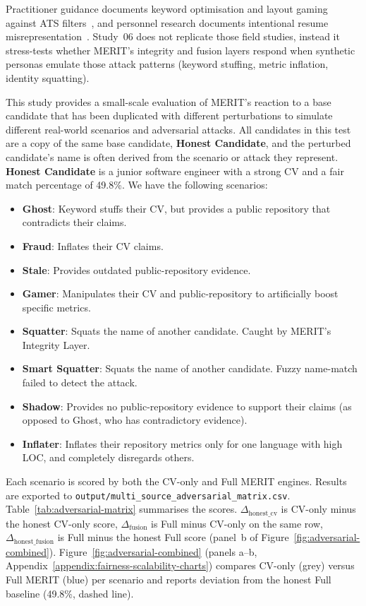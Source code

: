 Practitioner guidance documents keyword optimisation and layout gaming against ATS filters~\cite{marr2019,fuller2021hiddenworkers}, 
and personnel research documents intentional resume misrepresentation~\cite{henle2019_resume_fraud}.
Study~06 does not replicate those field studies, instead it stress-tests whether MERIT's integrity and fusion layers respond when 
synthetic personas emulate those attack patterns (keyword stuffing, metric inflation, identity squatting).

This study provides a small-scale evaluation of MERIT's reaction to a base candidate that has been duplicated with 
different perturbations to simulate different real-world scenarios and adversarial attacks. All candidates in this test are 
a copy of the same base candidate, \textbf{Honest Candidate}, and the perturbed candidate's name is often derived from
the scenario or attack they represent. \textbf{Honest Candidate} is a junior software engineer with a strong CV and a fair 
match percentage of 49.8\%. We have the following scenarios:
\begin{itemize}
    \item \textbf{Ghost}: Keyword stuffs their CV, but provides a public repository that contradicts their claims.
    \item \textbf{Fraud}: Inflates their CV claims.
    \item \textbf{Stale}: Provides outdated public-repository evidence.
    \item \textbf{Gamer}: Manipulates their CV and public-repository to artificially boost specific metrics.
    \item \textbf{Squatter}: Squats the name of another candidate. Caught by MERIT's Integrity Layer.
    \item \textbf{Smart Squatter}: Squats the name of another candidate. Fuzzy name-match failed to detect the attack.
    \item \textbf{Shadow}: Provides no public-repository evidence to support their claims (as opposed to Ghost, who has contradictory evidence).
    \item \textbf{Inflater}: Inflates their repository metrics only for one language with high LOC, and completely disregards others.
\end{itemize}

Each scenario is scored by both the CV-only and Full MERIT engines. 
Results are exported to \texttt{output/multi\_source\_adversarial\_matrix.csv}. 
Table~\ref{tab:adversarial-matrix} summarises the scores.
$\Delta_{\mathrm{honest\_cv}}$ is CV-only minus the honest CV-only score, $\Delta_{\mathrm{fusion}}$ is Full minus CV-only on the same row,
$\Delta_{\mathrm{honest\_fusion}}$ is Full minus the honest Full score 
(panel~b of Figure~\ref{fig:adversarial-combined}).
Figure~\ref{fig:adversarial-combined} 
(panels a--b, Appendix~\ref{appendix:fairness-scalability-charts}) 
compares CV-only (grey) versus
Full MERIT (blue) per scenario and reports deviation from the honest Full baseline (49.8\%, dashed line).

